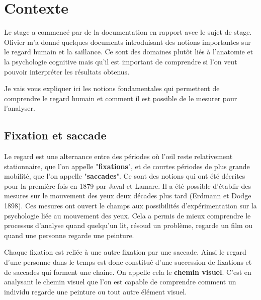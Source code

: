 \chapter{Contexte}
\par
Le stage a commencé par de la documentation en rapport avec le sujet de stage. Olivier m'a donné quelques documents introduisant des notions importantes sur le regard humain et la saillance\cite{gaze}\cite{how_see_art}\cite{visual_exploration}\cite{van_gogh}\cite{caravagio}. Ce sont des domaines plutôt liés à l'anatomie et la psychologie cognitive mais qu'il est important de comprendre si l'on veut pouvoir interpréter les résultats obtenus.
\par
Je vais vous expliquer ici les notions fondamentales qui permettent de comprendre le regard humain et comment il est possible de le mesurer pour l'analyser.

\section{Fixation et saccade}
\label{section:fix_sacc}
\par
Le regard est une alternance entre des périodes où l'\oe{}il reste relativement stationnaire, que l'on appelle "\textbf{fixations}", et de courtes périodes de plus grande mobilité, que l'on appelle "\textbf{saccades}"\cite{gaze}. Ce sont des notions qui ont été décrites pour la première fois en 1879 par Javal et Lamare. Il a été possible d'établir des mesures sur le mouvement des yeux deux décades plus tard (Erdmann et Dodge 1898). Ces mesures ont ouvert le champs aux possibilités d'expérimentation sur la psychologie liée au mouvement des yeux. Cela a permis de mieux comprendre le processus d'analyse quand quelqu'un lit, résoud un problème, regarde un film ou quand une personne regarde une peinture.

\par
Chaque fixation est reliée à une autre fixation par une saccade. Ainsi le regard d'une personne dans le temps est donc constitué d'une succession de fixations et de saccades qui forment une chaine. On appelle cela le \textbf{chemin visuel}. C'est en analysant le chemin visuel que l'on est capable de comprendre comment un individu regarde une peinture ou tout autre élément visuel.

